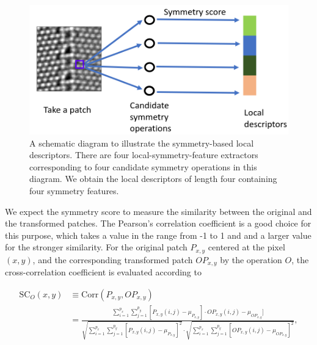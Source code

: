 \documentclass[twocolumn,amsmath, floatfix]{revtex4}
\begin{document}

\begin{figure}[htbp]
\centering
\includegraphics[width=1.\columnwidth]{schematic_diagram_local_descriptors.png}
\caption{A schematic diagram to illustrate the symmetry-based local descriptors. There are four local-symmetry-feature extractors corresponding to four candidate symmetry operations in this diagram. We obtain the local descriptors of length four containing four symmetry features.} 
\label{local_descriptors}
\end{figure}
We expect the symmetry score to measure the similarity between the original and the transformed patches. The Pearson's correlation coefficient is a good choice for this purpose, which takes a value in the range from -1 to 1 and and a larger value for the stronger similarity. For the original patch $P_{x,y}$ centered at the pixel $(x,y)$, and the corresponding transformed patch $OP_{x,y}$ by the operation $O$, the cross-correlation coefficient is evaluated according to 
\begin{widetext}
\begin{equation}\label{symmetry_score}
\begin{aligned}
\mathrm{SC}_O(x,y)  &\equiv \mathrm{Corr}\left( P_{x,y}, OP_{x,y} \right) \\
& =  \frac{\sum_{i=1}^{p_x}\sum_{j=1}^{p_y}[P_{x,y}(i,j)-\mu_{P_{x,y}}]\cdot OP_{x,y}(i,j)-\mu_{OP_{x,y}}{}]}{\sqrt{\sum_{i=1}^{p_x}\sum_{j=1}^{p_y}[P_{x,y}(i,j)-\mu_{P_{x,y}}]^2} \cdot \sqrt{\sum_{i=1}^{p_x}\sum_{j=1}^{p_y}[OP_{x,y}(i,j)-\mu_{OP_{x,y}}]^2} },
\end{aligned}
\end{equation}
\end{widetext}
\end{document}
